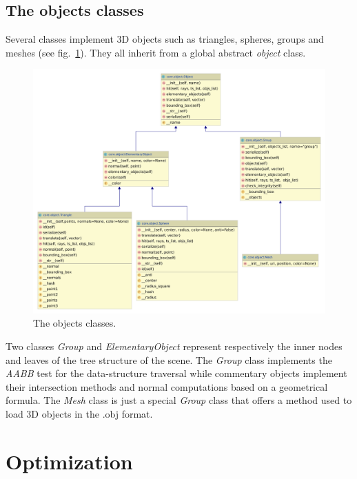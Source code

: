 \documentclass[acmsmall]{acmart}
\begin{document}
\subsection*{The objects classes}
Several classes implement 3D objects such as triangles, spheres, groups and meshes (see fig.~\ref{fig:object}). They all inherit from a global abstract \emph{object} class.
\begin{figure}[h]
    \centering
    \includegraphics[scale=0.3]{img/object.pdf}
    \caption{The objects classes.}
    \label{fig:object}
\end{figure}

Two classes \emph{Group} and \emph{ElementaryObject} represent respectively the inner nodes and leaves of the tree structure of the scene.
The \textit{Group} class implements the \textit{AABB} test for the data-structure traversal while commentary objects implement their intersection methods and normal computations based on a geometrical formula.
The \emph{Mesh} class is just a special \textit{Group} class that offers a method used to load 3D objects in the .obj format.


\section{Optimization}
\end{document}
